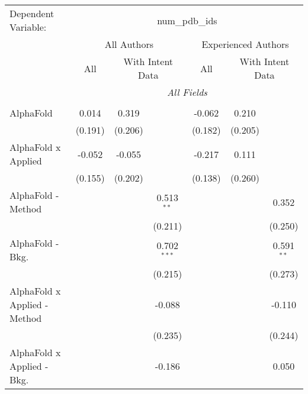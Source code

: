 \begingroup
\centering
\begin{tabular}{lcccccc}
   \tabularnewline \midrule \midrule
   Dependent Variable: & \multicolumn{6}{c}{num\_pdb\_ids}\\
 & \multicolumn{3}{c}{All Authors} & \multicolumn{3}{c}{Experienced Authors} \\
\cmidrule(lr){2-4} \cmidrule(lr){5-7}
 & \multicolumn{1}{c}{All} & \multicolumn{2}{c}{With Intent Data} & \multicolumn{1}{c}{All} & \multicolumn{2}{c}{With Intent Data} \\
\cmidrule(lr){2-2} \cmidrule(lr){3-4} \cmidrule(lr){5-5} \cmidrule(lr){6-7}
 & \multicolumn{6}{c}{\textit{All Fields}} \\ \\
   AlphaFold                      & 0.014          & 0.319        &               & -0.062        & 0.210         &   \\   
                                  & (0.191)        & (0.206)      &               & (0.182)       & (0.205)       &   \\   
   AlphaFold x Applied            & -0.052         & -0.055       &               & -0.217        & 0.111         &   \\   
                                  & (0.155)        & (0.202)      &               & (0.138)       & (0.260)       &   \\   
   AlphaFold - Method             &                &              & 0.513$^{**}$  &               &               & 0.352\\   
                                  &                &              & (0.211)       &               &               & (0.250)\\   
   AlphaFold - Bkg.               &                &              & 0.702$^{***}$ &               &               & 0.591$^{**}$\\   
                                  &                &              & (0.215)       &               &               & (0.273)\\   
   AlphaFold x Applied - Method   &                &              & -0.088        &               &               & -0.110\\   
                                  &                &              & (0.235)       &               &               & (0.244)\\   
   AlphaFold x Applied - Bkg.     &                &              & -0.186        &               &               & 0.050\\   

\end{tabular}
